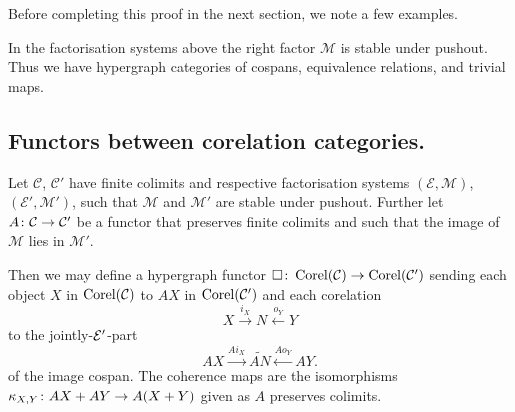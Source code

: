 Before completing this proof in the next section, we note a few examples.
\begin{examples}
  In the factorisation systems above the right factor $\mathcal M$ is stable
  under pushout.  Thus we have hypergraph categories of cospans, equivalence
  relations, and trivial maps.  
\end{examples}

\subsection{Functors between corelation categories.}

\begin{proposition} \label{prop.corelfunctors}
  Let $\mathcal C$, $\mathcal C'$ have finite colimits and respective
  factorisation systems $(\mathcal E, \mathcal M)$, $(\mathcal E', \mathcal M')$,
  such that $\mathcal M$ and $\mathcal M'$ are stable under pushout. Further let
  $A{\colon} \mathcal C \to \mathcal C'$ be a functor that preserves finite colimits
  and such that the image of $\mathcal M$ lies in $\mathcal M'$.

  Then we may define a hypergraph functor $\square{\colon} \operatorname{{Corel}}(\mathcal C) \to
  \operatorname{{Corel}}(\mathcal C')$ sending each object $X$ in $\operatorname{{Corel}}(\mathcal C)$ to $AX$ in
  $\operatorname{{Corel}}(\mathcal C')$ and each corelation 
  \[
    X \stackrel{i_X}{\longrightarrow} N \stackrel{o_Y}{\longleftarrow} Y 
  \]
  to the jointly-$\mathcal E'$-part
  \[
    AX \stackrel{Ai_X}{\longrightarrow} \widetilde{AN} \stackrel{Ao_Y}{\longleftarrow} AY.
  \]
  of the image cospan. The coherence maps are the isomorphisms
  $\kappa_{X,Y}{\colon} AX+AY \to A(X+Y)$ given as $A$ preserves colimits.
\end{proposition}

